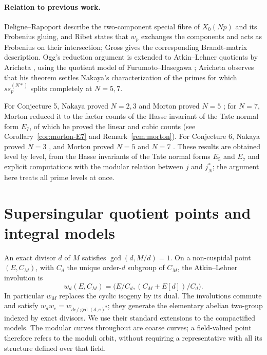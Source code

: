 \documentclass[11pt,a4paper]{article}
\theoremstyle{remark}\newtheorem{remark}[theorem]{Remark}
\numberwithin{equation}{section}
\begin{document}
	\paragraph{Relation to previous work.}
	Deligne--Rapoport \cite[VI, Theorem 6.9]{DR} describe the two-component special fibre of $X_0(Np)$ and its Frobenius gluing, and Ribet \cite[Proposition 3.8(i), p.~446]{Ribet} states that $w_p$ exchanges the components and acts as Frobenius on their intersection; Gross \cite[Proposition 2.7(3)]{Gross} gives the corresponding Brandt-matrix description. Ogg's reduction argument \cite{OggRed} is extended to Atkin--Lehner quotients by Aricheta \cite[Theorem 3.1]{Aricheta}, using the quotient model of Furumoto--Hasegawa \cite[Section 5]{FH}; Aricheta observes \cite[Section 1]{Aricheta} that his theorem settles Nakaya's characterization of the primes for which $ss_p^{(N*)}$ splits completely at $N=5,7$.
	
	For Conjecture 5, Nakaya proved $N=2,3$ \cite[Theorem 4]{Nakaya} and Morton proved $N=5$ \cite{Morton5a,Morton5b}; for $N=7$, Morton reduced it to the factor counts of the Hasse invariant of the Tate normal form $E_7$, of which he proved the linear and cubic counts \cite[Theorem A]{Morton7} (see Corollary~\ref{cor:morton-E7} and Remark~\ref{rem:morton}). For Conjecture 6, Nakaya proved $N=3$ \cite{Nakaya}, and Morton proved $N=5$ \cite[Section 7]{Morton5b} and $N=7$ \cite[Section 3]{MortonFricke}. These results are obtained level by level, from the Hasse invariants of the Tate normal forms $E_5$ and $E_7$ and explicit computations with the modular relation between $j$ and $j_N^*$; the argument here treats all prime levels at once.
	
	\section{Supersingular quotient points and integral models}\label{sec:prelim}
	An exact divisor $d$ of $M$ satisfies $\gcd(d,M/d)=1$. On a non-cuspidal point $(E,C_M)$, with $C_d$ the unique order-$d$ subgroup of $C_M$, the Atkin--Lehner involution is
	\[
	w_d(E,C_M)=\bigl(E/C_d,(C_M+E[d])/C_d\bigr).
	\]
	In particular $w_M$ replaces the cyclic isogeny by its dual. The involutions commute and satisfy $w_dw_e=w_{de/\gcd(d,e)^2}$; they generate the elementary abelian two-group indexed by exact divisors. We use their standard extensions to the compactified models. The modular curves throughout are coarse curves; a field-valued point therefore refers to the moduli orbit, without requiring a representative with all its structure defined over that field.
	
\end{document}
